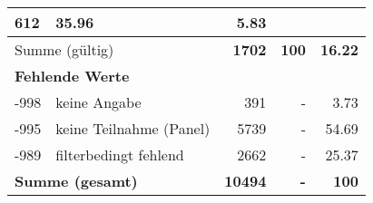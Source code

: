 \begin{longtable}{lXrrr}
       \num{612} &
       \num[round-mode=places,round-precision=2]{35.96} &
         \num[round-mode=places,round-precision=2]{5.83} \\
     \midrule
     \multicolumn{2}{l}{Summe (gültig)} &
       \textbf{\num{1702}} &
     \textbf{\num{100}} &
       \textbf{\num[round-mode=places,round-precision=2]{16.22}} \\
     \multicolumn{5}{l}{\textbf{Fehlende Werte}}\\
       -998 &
       keine Angabe &
         \num{391} &
        - &
         \num[round-mode=places,round-precision=2]{3.73} \\
       -995 &
       keine Teilnahme (Panel) &
         \num{5739} &
        - &
         \num[round-mode=places,round-precision=2]{54.69} \\
       -989 &
       filterbedingt fehlend &
         \num{2662} &
        - &
         \num[round-mode=places,round-precision=2]{25.37} \\
     \midrule
     \multicolumn{2}{l}{\textbf{Summe (gesamt)}} &
          \textbf{\num{10494}} &
        \textbf{-} &
        \textbf{\num{100}} \\
     \bottomrule
     \end{longtable}
     
